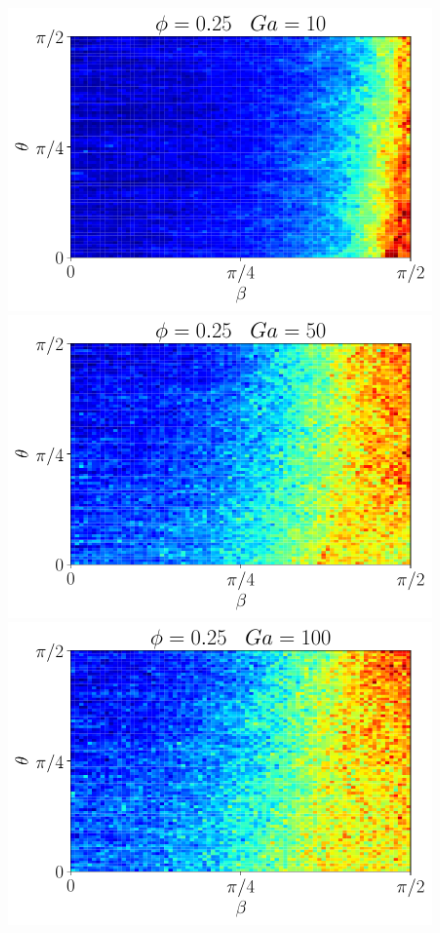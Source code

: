 \begin{figure}[h!]
    \includegraphics[height =\size]{image/N_10/beta/2DMAP_beta_theta_dmin_10_Bo0_5PHI0_25mu_r0_42Ga10.pdf}
    \includegraphics[height =\size]{image/N_10/beta/2DMAP_beta_theta_dmin_10_Bo0_5PHI0_25mu_r0_42Ga50.pdf}
    \includegraphics[height =\size]{image/N_10/beta/2DMAP_beta_theta_dmin_10_Bo0_5PHI0_25mu_r0_42Ga100.pdf}

\end{figure}
